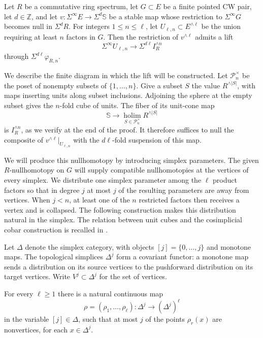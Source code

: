 \begin{proposition}
\label{prop:compatible-adams-lift}
Let $R$ be a commutative ring spectrum, let $G\subset E$ be a finite
pointed CW pair, let $d\in\mathbb Z$, and let
$v:\Sigma^\infty E\to\Sigma^d\mathbb S$ be a stable map whose
restriction to $\Sigma^\infty G$ becomes null in $\Sigma^dR$.
For integers $1\leq n\leq\ell$, let
$U_{\ell,n}\subset E^{\wedge\ell}$ be the union requiring at least
$n$ factors in $G$.  Then the restriction of $v^{\wedge\ell}$ admits
a lift
\[
\Sigma^\infty U_{\ell,n}\longrightarrow\Sigma^{d\ell}I_R^{\wedge n}
\]
through $\Sigma^{d\ell}\varphi_{R,n}$.
\end{proposition}

We describe the finite diagram in which the lift will be constructed.
Let $\mathcal P_n^\times$ be the poset of nonempty subsets of
$\{1,\ldots,n\}$.  Give a subset $S$ the value $R^{\wedge|S|}$,
with maps inserting units along subset inclusions.  Adjoining the
sphere at the empty subset gives the $n$-fold cube of units.  The fiber
of its unit-cone map
\[
\mathbb S\longrightarrow
\operatorname*{holim}_{S\in\mathcal P_n^\times}R^{\wedge|S|}
\]
is $I_R^{\wedge n}$, as we verify at the end of the proof.
It therefore suffices to null the composite of
$v^{\wedge\ell}|_{U_{\ell,n}}$ with the $d\ell$-fold suspension
of this map.

We will produce this nullhomotopy by introducing simplex parameters.
The given $R$-nullhomotopy on $G$ will supply compatible nullhomotopies
at the vertices of every simplex.  We distribute one simplex parameter
among the $\ell$ product factors so that in degree $j$ at most $j$
of the resulting parameters are away from vertices.  When $j<n$, at
least one of the $n$ restricted factors then receives a vertex and
is collapsed.  The following construction makes this distribution
natural in the simplex.  The relation between unit cubes and the
cosimplicial cobar construction is recalled in
\cite[Section~2.1, Propositions~2.11 and~2.14]{MathewNaumannNoel2017}.

Let $\Delta$ denote the simplex category, with objects
$[j]=\{0,\ldots,j\}$ and monotone maps.  The topological simplices
$\Delta^j$ form a covariant functor: a monotone map sends a distribution
on its source vertices to the pushforward distribution on its target
vertices.  Write $V^j\subset\Delta^j$ for the set of vertices.

\begin{lemma}
\label{lem:simplex-slicing}
For every $\ell\geq1$ there is a natural continuous map
\[
\rho=(\rho_1,\ldots,\rho_\ell):
\Delta^j\longrightarrow(\Delta^j)^\ell
\]
in the variable $[j]\in\Delta$, such that at most $j$ of the points
$\rho_r(x)$ are nonvertices, for each $x\in\Delta^j$.
\end{lemma}

